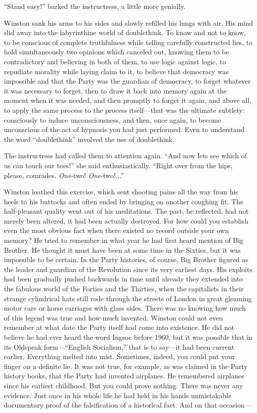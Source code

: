 ``Stand easy!'' barked the instructress, a little more genially.

Winston sank his arms to his sides and slowly refilled his lungs with
air. His mind slid away into the labyrinthine world of doublethink. To
know and not to know, to be conscious of complete truthfulness while
telling carefully constructed lies, to hold simultaneously two opinions
which canceled out, knowing them to be contradictory and believing in
both of them, to use logic against logic, to repudiate morality while
laying claim to it, to believe that democracy was impossible and that
the Party was the guardian of democracy, to forget whatever it was
necessary to forget, then to draw it back into memory again at the
moment when it was needed, and then promptly to forget it again, and
above all, to apply the same process to the process itself---that was
the ultimate subtlety: consciously to induce unconsciousness, and then,
once again, to become unconscious of the act of hypnosis you had just
performed. Even to understand the word ``doublethink'' involved the use of
doublethink.

The instructress had called them to attention again. ``And now
let\textquotesingle s see which of us can touch our toes!'' she said
enthusiastically. ``Right over from the hips, please, comrades.
\emph{One}-two! \emph{One}-two!...''

Winston loathed this exercise, which sent shooting pains all the way
from his heels to his buttocks and often ended by bringing on another
coughing fit. The half-pleasant quality went out of his meditations. The
past, he reflected, had not merely been altered, it had been actually
destroyed. For how could you establish even the most obvious fact when
there existed no record outside your own memory? He tried to remember in
what year he had first heard mention of Big Brother. He thought it must
have been at some time in the Sixties, but it was impossible to be
certain. In the Party histories, of course, Big Brother figured as the
leader and guardian of the Revolution since its very earliest days. His
exploits had been gradually pushed backwards in time until already they
extended into the fabulous world of the Forties and the Thirties, when
the capitalists in their strange cylindrical hats still rode through the
streets of London in great gleaming motor cars or horse carriages with
glass sides. There was no knowing how much of this legend was true and
how much invented. Winston could not even remember at what date the
Party itself had come into existence. He did not believe he had ever
heard the word Ingsoc before 1960, but it was possible that in its
Oldspeak form---``English Socialism,'' that is to say---it had been
current earlier. Everything melted into mist. Sometimes, indeed, you
could put your finger on a definite lie. It was not true, for example,
as was claimed in the Party history books, that the Party had invented
airplanes. He remembered airplanes since his earliest childhood. But you
could prove nothing. There was never any evidence. Just once in his
whole life he had held in his hands unmistakable documentary proof of
the falsification of a historical fact. And on that occasion---

